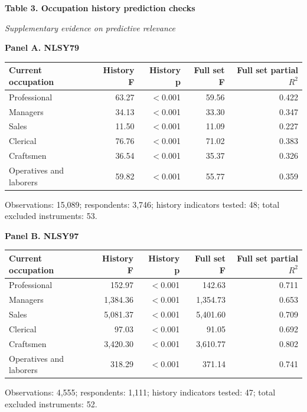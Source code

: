 \documentclass[10pt,letterpaper]{article}
\begin{document}
\newpage
\begin{center}
{\large\bfseries Table 3. Occupation history prediction checks}\par
\smallskip
\textit{Supplementary evidence on predictive relevance}\par
\medskip
\end{center}
\small
\noindent\textbf{Panel A. NLSY79}\par\smallskip
\noindent\begin{tabular*}{\textwidth}{@{\extracolsep{\fill}}lrrrr@{}}
\toprule
Current occupation & History F & History p & Full set F & Full set partial $R^2$ \\
\midrule
Professional & 63.27 & $<$0.001 & 59.56 & 0.422 \\
Managers & 34.13 & $<$0.001 & 33.30 & 0.347 \\
Sales & 11.50 & $<$0.001 & 11.09 & 0.227 \\
Clerical & 76.76 & $<$0.001 & 71.02 & 0.383 \\
Craftsmen & 36.54 & $<$0.001 & 35.37 & 0.326 \\
Operatives and laborers & 59.82 & $<$0.001 & 55.77 & 0.359 \\
\bottomrule
\end{tabular*}\par\smallskip
{\footnotesize Observations: 15,089; respondents: 3,746; history indicators tested: 48; total excluded instruments: 53.\par}
\medskip
\noindent\textbf{Panel B. NLSY97}\par\smallskip
\noindent\begin{tabular*}{\textwidth}{@{\extracolsep{\fill}}lrrrr@{}}
\toprule
Current occupation & History F & History p & Full set F & Full set partial $R^2$ \\
\midrule
Professional & 152.97 & $<$0.001 & 142.63 & 0.711 \\
Managers & 1,384.36 & $<$0.001 & 1,354.73 & 0.653 \\
Sales & 5,081.37 & $<$0.001 & 5,401.60 & 0.709 \\
Clerical & 97.03 & $<$0.001 & 91.05 & 0.692 \\
Craftsmen & 3,420.30 & $<$0.001 & 3,610.77 & 0.802 \\
Operatives and laborers & 318.29 & $<$0.001 & 371.14 & 0.741 \\
\bottomrule
\end{tabular*}\par\smallskip
{\footnotesize Observations: 4,555; respondents: 1,111; history indicators tested: 47; total excluded instruments: 52.\par}
\end{document}
